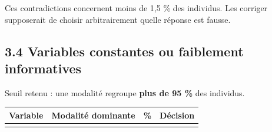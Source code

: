 \documentclass[

  french,

  10pt,

  a4paper,

]{article}
\newcounter{none} %
\begin{document}
Ces contradictions concernent moins de 1,5 \% des individus. Les corriger supposerait de choisir arbitrairement quelle réponse est fausse.



\subsection{3.4 Variables constantes ou faiblement informatives}



Seuil retenu : une modalité regroupe \textbf{plus de 95 \%} des individus.



{\def\LTcaptype{none} %

\begin{longtable}[]{@{}

  >{\raggedright\arraybackslash}p{}

  >{\raggedright\arraybackslash}p{}

  >{\raggedleft\arraybackslash}p{}

  >{\raggedright\arraybackslash}p{}@{}}

\toprule\noalign{}

\begin{minipage}[b]{\linewidth}\raggedright

Variable

\end{minipage} & \begin{minipage}[b]{\linewidth}\raggedright

Modalité dominante

\end{minipage} & \begin{minipage}[b]{\linewidth}\raggedleft

\%

\end{minipage} & \begin{minipage}[b]{\linewidth}\raggedright

Décision

\end{minipage} \\

\midrule\noalign{}

\endhead

\bottomrule\noalign{}


\end{longtable}}
\end{document}
